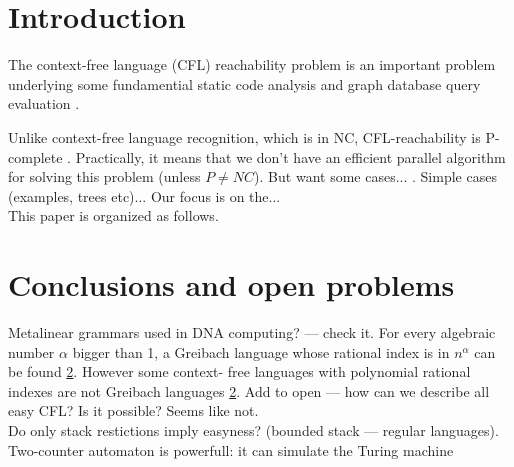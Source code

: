 \documentclass[smallextended]{svjour3}       %
\begin{document}
\section{Introduction}
\label{intro}
The context-free language (CFL) reachability problem is an important problem underlying some fundamential static code analysis \cite*{RepsBasic, Incremental} and graph database query evaluation \cite{HellingsCFPQ}\cite{RDF}\cite{GrigorevRagozina}.
\par
Unlike context-free language recognition, which is in NC, CFL-reachability is P-complete \cite{Yannakakis}\cite{RepSeq}. Practically, it means that we don't have an efficient parallel algorithm for solving this problem (unless $P \neq NC$). But want some cases... . Simple cases (examples, trees etc)... Our focus is on the...
\\This paper is organized as follows.




\section{Conclusions and open problems}
Metalinear grammars used in DNA computing? --- check it.
For every algebraic number $\alpha$ bigger than 1, a Greibach language whose rational index is in $n^\alpha$ can be found \ref{}. However some context-
free languages with polynomial rational indexes are not Greibach languages \ref{}.
Add to open --- how can we describe all easy CFL? Is it possible?  Seems like not. 
\\Do only stack restictions imply easyness? (bounded stack --- regular languages).
\\Two-counter automaton is powerfull: it can simulate the Turing machine




%
%


\end{document}

